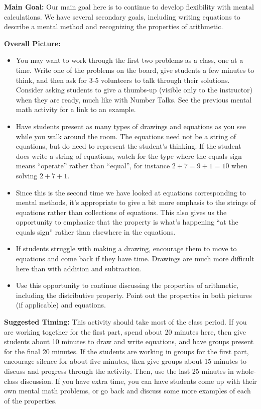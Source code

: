 \documentclass[nooutcomes,noauthor,handout]{ximera}
\begin{document}
\newpage
\begin{instructorNotes}

{\bf Main Goal:} Our main goal here is to continue to develop flexibility with mental calculations. We have several secondary goals, including writing equations to describe a mental method and recognizing the properties of arithmetic.


{\bf Overall Picture:}

\begin{itemize}
\item You may want to work through the first two problems as a class, one at a time. Write one of the problems on the board, give students a few minutes to think, and then ask for 3-5 volunteers to talk through their solutions. Consider asking students to give a thumbs-up (visible only to the instructor) when they are ready, much like with Number Talks. See the previous mental math activity for a link to an example.
\item Have students present as many types of drawings and equations as you see while you walk around the room. The equations need not be a string of equations, but do need to represent the student's thinking. If the student does write a string of equations, watch for the type where the equals sign means ``operate'' rather than ``equal'', for instance $2 + 7 = 9 + 1 = 10$ when solving $2 + 7 + 1$.
\item Since this is the second time we have looked at equations corresponding to mental methods, it's appropriate to give a bit more emphasis to the strings of equations rather than collections of equations. This also gives us the opportunity to emphasize that the property is what's happening ``at the equals sign'' rather than elsewhere in the equations.
\item If students struggle with making a drawing, encourage them to move to equations and come back if they have time. Drawings are much more difficult here than with addition and subtraction.
\item Use this opportunity to continue discussing the properties of arithmetic, including the distributive property. Point out the properties in both pictures (if applicable) and equations.

\end{itemize}






{\bf Suggested Timing:} This activity should take most of the class period. If you are working together for the first part, spend about 20 minutes here, then give students about 10 minutes to draw and write equations, and have groups present for the final 20 minutes. If the students are working in groups for the first part, encourage silence for about five minutes, then give groups about 15 minutes to discuss and progress through the activity. Then, use the last 25 minutes in whole-class discussion. If you have extra time, you can have students come up with their own mental math problems, or go back and discuss some more examples of each of the properties.

\end{instructorNotes}
\end{document}
